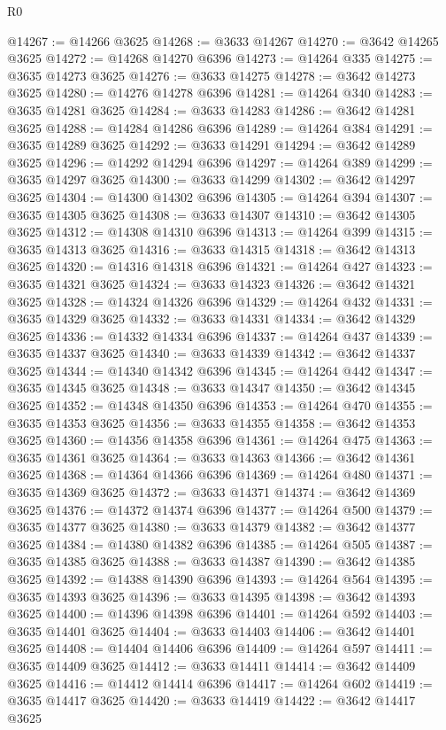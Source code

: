 \begin{lexlean}{R0}
\begin{coremodule}
@14267 := @14266 @3625
@14268 := @3633 @14267
@14270 := @3642 @14265 @3625
@14272 := @14268 @14270 @6396
@14273 := @14264 @335
@14275 := @3635 @14273 @3625
@14276 := @3633 @14275
@14278 := @3642 @14273 @3625
@14280 := @14276 @14278 @6396
@14281 := @14264 @340
@14283 := @3635 @14281 @3625
@14284 := @3633 @14283
@14286 := @3642 @14281 @3625
@14288 := @14284 @14286 @6396
@14289 := @14264 @384
@14291 := @3635 @14289 @3625
@14292 := @3633 @14291
@14294 := @3642 @14289 @3625
@14296 := @14292 @14294 @6396
@14297 := @14264 @389
@14299 := @3635 @14297 @3625
@14300 := @3633 @14299
@14302 := @3642 @14297 @3625
@14304 := @14300 @14302 @6396
@14305 := @14264 @394
@14307 := @3635 @14305 @3625
@14308 := @3633 @14307
@14310 := @3642 @14305 @3625
@14312 := @14308 @14310 @6396
@14313 := @14264 @399
@14315 := @3635 @14313 @3625
@14316 := @3633 @14315
@14318 := @3642 @14313 @3625
@14320 := @14316 @14318 @6396
@14321 := @14264 @427
@14323 := @3635 @14321 @3625
@14324 := @3633 @14323
@14326 := @3642 @14321 @3625
@14328 := @14324 @14326 @6396
@14329 := @14264 @432
@14331 := @3635 @14329 @3625
@14332 := @3633 @14331
@14334 := @3642 @14329 @3625
@14336 := @14332 @14334 @6396
@14337 := @14264 @437
@14339 := @3635 @14337 @3625
@14340 := @3633 @14339
@14342 := @3642 @14337 @3625
@14344 := @14340 @14342 @6396
@14345 := @14264 @442
@14347 := @3635 @14345 @3625
@14348 := @3633 @14347
@14350 := @3642 @14345 @3625
@14352 := @14348 @14350 @6396
@14353 := @14264 @470
@14355 := @3635 @14353 @3625
@14356 := @3633 @14355
@14358 := @3642 @14353 @3625
@14360 := @14356 @14358 @6396
@14361 := @14264 @475
@14363 := @3635 @14361 @3625
@14364 := @3633 @14363
@14366 := @3642 @14361 @3625
@14368 := @14364 @14366 @6396
@14369 := @14264 @480
@14371 := @3635 @14369 @3625
@14372 := @3633 @14371
@14374 := @3642 @14369 @3625
@14376 := @14372 @14374 @6396
@14377 := @14264 @500
@14379 := @3635 @14377 @3625
@14380 := @3633 @14379
@14382 := @3642 @14377 @3625
@14384 := @14380 @14382 @6396
@14385 := @14264 @505
@14387 := @3635 @14385 @3625
@14388 := @3633 @14387
@14390 := @3642 @14385 @3625
@14392 := @14388 @14390 @6396
@14393 := @14264 @564
@14395 := @3635 @14393 @3625
@14396 := @3633 @14395
@14398 := @3642 @14393 @3625
@14400 := @14396 @14398 @6396
@14401 := @14264 @592
@14403 := @3635 @14401 @3625
@14404 := @3633 @14403
@14406 := @3642 @14401 @3625
@14408 := @14404 @14406 @6396
@14409 := @14264 @597
@14411 := @3635 @14409 @3625
@14412 := @3633 @14411
@14414 := @3642 @14409 @3625
@14416 := @14412 @14414 @6396
@14417 := @14264 @602
@14419 := @3635 @14417 @3625
@14420 := @3633 @14419
@14422 := @3642 @14417 @3625

\end{coremodule}
\end{lexlean}
